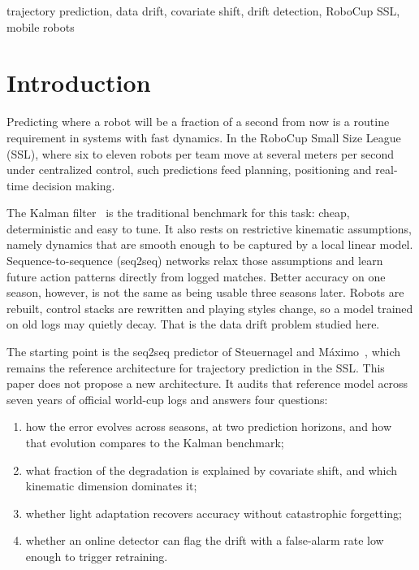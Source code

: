 \documentclass[conference]{IEEEtran}
\newif\ifmarkchanges
\newcommand{\chg}[1]{\ifmarkchanges\hl{#1}\else#1\fi}
\newcommand{\ins}[1]{\ifmarkchanges\hl{\footnotesize[+ #1]}\fi}
\begin{document}
\begin{IEEEkeywords}
trajectory prediction, data drift, covariate shift, drift detection,
RoboCup SSL, mobile robots
\end{IEEEkeywords}

\section{Introduction}
\label{sec:intro}

Predicting where a robot will be a fraction of a second from now is a routine
requirement in systems with fast dynamics. In the RoboCup Small Size League
(SSL), where six to eleven robots per team move at several meters per second
under centralized control, such predictions feed planning, positioning and
real-time decision making. \ins{o que e a Division A}

The Kalman filter~\cite{kalman} is the traditional benchmark for this task:
cheap, deterministic and easy to tune. \ins{define o termo Kalman-filter
baseline} It also rests on restrictive kinematic
assumptions, namely dynamics that are smooth enough to be captured by a local
linear model. Sequence-to-sequence (seq2seq) networks relax those assumptions
and learn future action patterns directly from logged matches. \ins{cita
Steuernagel e M\'aximo aqui} Better accuracy
on one season, however, is not the same as being usable three seasons later.
\chg{Robots are rebuilt, control stacks are rewritten and playing styles change, so
a model trained on old logs may quietly decay. That is the data drift problem
studied here.}

\chg{The starting point is the seq2seq predictor of Steuernagel and
M\'aximo\mbox{~\cite{seq2seq}}, which remains the reference architecture for
trajectory prediction in the SSL. This paper does not propose a new
architecture. It audits that reference model across seven years of official
world-cup logs and answers four questions:}

\begin{enumerate}
  \item how the error evolves across seasons, at two prediction horizons, and
        how that evolution compares to the \chg{Kalman benchmark};
  \item what fraction of the degradation is explained by covariate shift, and
        which kinematic dimension dominates it;
  \item whether light adaptation recovers accuracy without catastrophic
        forgetting;
  \item whether an online detector can flag the drift with a false-alarm rate
        low enough to trigger retraining.
\end{enumerate}
\end{document}
